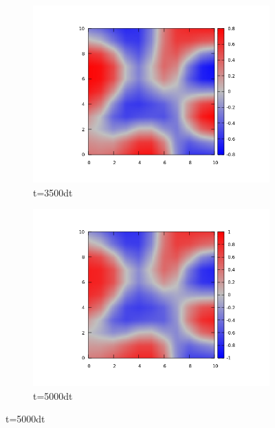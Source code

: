 \documentclass{article}
\begin{document}
\vfill
\begin{figure}
\centering
\begin{subfigure}{.5\textwidth}
  \centering
  \includegraphics[width=1.0\linewidth]{3500dt.png}
  \caption{t=3500dt}
  \label{fig:sub1}
\end{subfigure}%
\begin{subfigure}{.5\textwidth}
  \centering
  \includegraphics[width=1.0\linewidth]{5000dt.png}
  \caption{t=5000dt}
  \label{fig:sub2}
\end{subfigure}
\label{fig:test}
\end{figure}


\vfill
\clearpage
\end{document}
